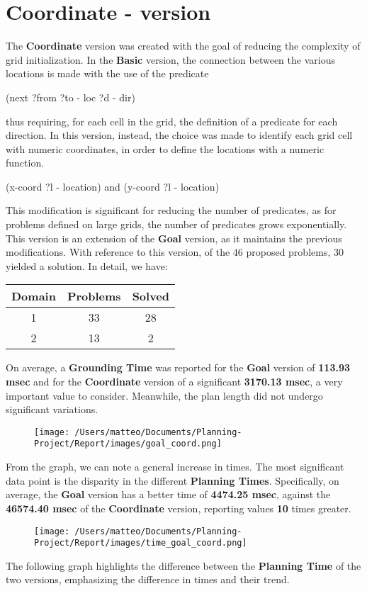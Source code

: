 \documentclass{article}
\begin{document}
\section*{Coordinate - version}
The \textbf{Coordinate} version was created with the goal of reducing the complexity of grid initialization.
In the \textbf{Basic} version, the connection between the various locations is made 
with the use of the predicate 
\begin{center}
    (next ?from ?to - loc ?d - dir)
\end{center}
thus requiring, for each cell in the grid, the definition of a predicate for each direction.
In this version, instead, the choice was made to identify each grid cell with numeric coordinates, in order to define the locations with a numeric function.
\begin{center}
    (x-coord ?l - location) \hspace{0.5cm} and \hspace{0.5cm} (y-coord ?l - location)
\end{center}
This modification is significant for reducing the number of predicates,
as for problems defined on large grids, the number of predicates grows exponentially.\\
This version is an extension of the \textbf{Goal} version, as it maintains the previous modifications.
With reference to this version, of the 46 proposed problems, 30 yielded a solution.
In detail, we have:
\begin{table}[H]
    \centering
    \begin{tabular}{|c|c|c|}
        \hline
        \textbf{Domain} & \textbf{Problems} & \textbf{Solved}\\
        \hline
        1 & 33 & 28 \\
        \hline
        2 & 13 & 2\\
        \hline
    \end{tabular}
\end{table}
\noindent
On average, a \textbf{Grounding Time} was reported for the \textbf{Goal} version of \textbf{113.93 msec} 
and for the \textbf{Coordinate} version of a significant \textbf{3170.13 msec}, a very important value to consider.
Meanwhile, the plan length did not undergo significant variations.
\begin{figure}[H]
    \centering
    \texttt{[image: /Users/matteo/Documents/Planning-Project/Report/images/goal\_coord.png]}
    \label{fig:coord}
\end{figure}
\noindent
From the graph, we can note a general increase in times.
The most significant data point is the disparity in the different \textbf{Planning Times}.
Specifically, on average, the \textbf{Goal} version has a better time of \textbf{4474.25 msec}, against the \textbf{46574.40 msec} of the \textbf{Coordinate} version, reporting values \textbf{10} times greater.
\begin{figure}[H]
    \centering
    \texttt{[image: /Users/matteo/Documents/Planning-Project/Report/images/time\_goal\_coord.png]}
    \label{fig:coord_states}
\end{figure}
\noindent
The following graph highlights the difference between the \textbf{Planning Time} of the two versions, emphasizing the difference in times and their trend.
\end{document}
